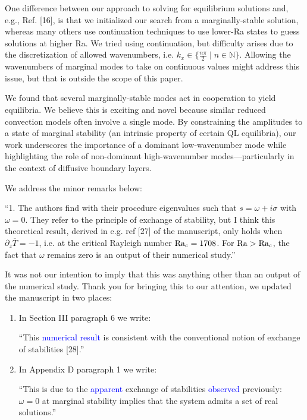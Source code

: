 \documentclass{article}
\begin{document}
\vspace{0.4cm}

One difference between our approach to solving for equilibrium solutions and, e.g., Ref. [16], is that we initialized our search from a marginally-stable solution, whereas many others use continuation techniques to use lower-Ra states to guess solutions at higher Ra. We tried using continuation, but difficulty arises due to the discretization of allowed wavenumbers, i.e. $k_x \in \{\frac{n\pi}{2}\; | \; n \in \mathbb{N}\}$.
Allowing the wavenumbers of marginal modes to take on continuous values might address this issue, but that is outside the scope of this paper.

\vspace{0.4cm}

We found that several marginally-stable modes act in cooperation to yield equilibria.
We believe this is exciting and novel because similar reduced convection models often involve a single mode.
By constraining the amplitudes to a state of marginal stability (an intrinsic property of certain QL equilibria), our work underscores the importance of a dominant low-wavenumber mode while highlighting the role of non-dominant high-wavenumber modes---particularly in the context of diffusive boundary layers.

\vspace{0.4cm}

We address the minor remarks below:

\vspace{0.4cm}

``1. The authors find with their procedure eigenvalues such that $s = \omega + i\sigma$ with $\omega= 0$.
They refer to the principle of exchange of stability, but I think this theoretical result, derived in e.g. ref [27] of the manuscript, only holds when $\partial_z \overline{T} = -1$, i.e.  at the critical Rayleigh number $\rm{Ra}_c= 1708$. For $\rm{Ra} > \rm{Ra}_c$, the fact that $\omega$ remains zero is an output of their numerical study.''

\vspace{0.4cm}
It was not our intention to imply that this was anything other than an output of the numerical study. Thank you for bringing this to our attention, we updated the manuscript in two places:
\vspace{0.4cm}
\begin{enumerate}[label=\alph*)]
    \item In Section III paragraph 6 we write:

          ``This \textcolor{blue}{numerical result} is consistent with the conventional notion of exchange of stabilities [28].''

    \item In Appendix D paragraph 1 we write:

          ``This is due to the \textcolor{blue}{apparent} exchange of stabilities \textcolor{blue}{observed} previously: $\omega = 0$ at marginal stability implies that the system admits a set of real solutions.''

\end{enumerate}
\end{document}
